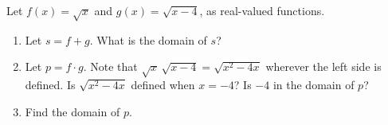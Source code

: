 Let $f(x)=\sqrt{x}$ and $g(x)=\sqrt{x-4}$, as real-valued functions.
\begin{enumerate}
\item[(a)] Let $s=f+g$. What is the domain of $s$?
\item[(b)] Let $p=f\cdot g$. Note that $\sqrt{x}\,\sqrt{x-4}=\sqrt{x^2-4x}$ wherever the left side is defined. Is $\sqrt{x^2-4x}$ defined when $x=-4$? Is $-4$ in the domain of $p$?
\item[(c)] Find the domain of $p$.
\end{enumerate}
